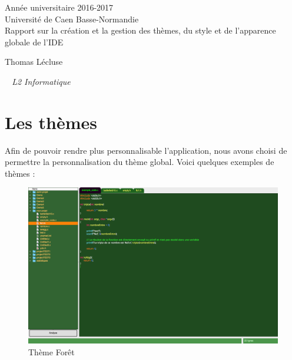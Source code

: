 \documentclass[a4paper,12pt]{article}
\begin{document}
\begin{titlepage}
	\begin{center}
		\Large{Année universitaire 2016-2017}\\
		\Large{Université de Caen Basse-Normandie}\\[1cm]
		
		\huge{Rapport sur la création et la gestion des thèmes, du style et de l'apparence globale de l'IDE}\\
		\vspace{3cm}
		
		Thomas Lécluse
		
	\normalsize{\textit{ ~ L2 Informatique}}\\
		\medskip
		\vspace{2cm}
				
	\end{center}
\end{titlepage}

\tableofcontents
\newpage

\section{Les thèmes}
	
	Afin de pouvoir rendre plus personnalisable l'application, nous avons choisi de permettre la personnalisation du thème global.
	Voici quelques exemples de thèmes : 
	
	
		\begin{figure}[h!]
			\begin{center}
				\includegraphics[scale=0.17]{imgs/theme_forest}
				\caption{Thème Forêt}
			\end{center}
		\end{figure}
		
\end{document}
